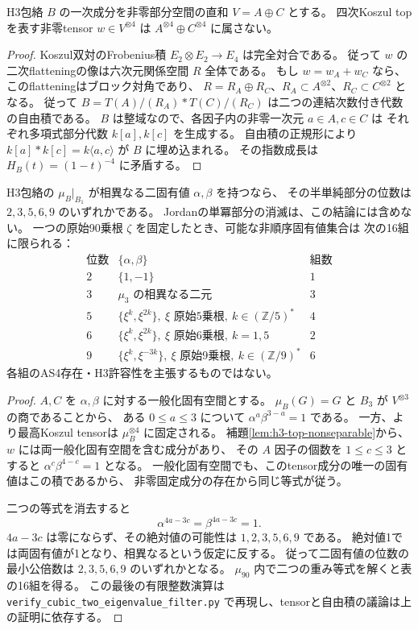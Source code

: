\begin{lemma}\label{lem:h3-top-nonseparable}
H3包絡 $B$ の一次成分を非零部分空間の直和 $V=A\oplus C$ とする。
四次Koszul topを表す非零tensor $w\in V^{\otimes4}$ は
$A^{\otimes4}\oplus C^{\otimes4}$ に属さない。
\end{lemma}
\begin{proof}
Koszul双対のFrobenius積 $E_2\otimes E_2\to E_4$ は完全対合である。
従って $w$ の二次flatteningの像は六次元関係空間 $R$ 全体である。
もし $w=w_A+w_C$ なら、このflatteningはブロック対角であり、
$R=R_A\oplus R_C$、$R_A\subset A^{\otimes2}$、$R_C\subset C^{\otimes2}$ となる。
従って $B=T(A)/(R_A)*T(C)/(R_C)$ は二つの連結次数付き代数の自由積である。
$B$ は整域なので、各因子内の非零一次元 $a\in A,c\in C$ は
それぞれ多項式部分代数 $k[a],k[c]$ を生成する。
自由積の正規形により $k[a]*k[c]=k\langle a,c\rangle$ が $B$ に埋め込まれる。
その指数成長は $H_B(t)=(1-t)^{-4}$ に矛盾する。
\end{proof}

\begin{proposition}[二固有値の有限スペクトル制約]
\label{prop:h3-two-eigenvalue-filter}
H3包絡の $\mu_B|_{B_1}$ が相異なる二固有値 $\alpha,\beta$ を持つなら、
その半単純部分の位数は $2,3,5,6,9$ のいずれかである。
Jordanの単冪部分の消滅は、この結論には含めない。
一つの原始90乗根 $\zeta$ を固定したとき、可能な非順序固有値集合は
次の16組に限られる：
\[
\begin{array}{c|l|c}
\text{位数}&\{\alpha,\beta\}&\text{組数}\\\hline
2&\{1,-1\}&1\\
3&\mu_3\text{ の相異なる二元}&3\\
5&\{\xi^k,\xi^{2k}\},\ \xi\text{ 原始5乗根},\ k\in(\mathbb Z/5)^*&4\\
6&\{\xi^k,\xi^{2k}\},\ \xi\text{ 原始6乗根},\ k=1,5&2\\
9&\{\xi^k,\xi^{-3k}\},\ \xi\text{ 原始9乗根},\ k\in(\mathbb Z/9)^*&6
\end{array}
\]
各組のAS4存在・H3許容性を主張するものではない。
\end{proposition}
\begin{proof}
$A,C$ を $\alpha,\beta$ に対する一般化固有空間とする。
$\mu_B(G)=G$ と $B_3$ が $V^{\otimes3}$ の商であることから、
ある $0\le a\le3$ について $\alpha^a\beta^{3-a}=1$ である。
一方、\cite[Theorem 6.3]{RRZ}より最高Koszul tensorは $\mu_B^{\otimes4}$ に固定される。
補題\ref{lem:h3-top-nonseparable}から、$w$ には両一般化固有空間を含む成分があり、
その $A$ 因子の個数を $1\le c\le3$ とすると
$\alpha^c\beta^{4-c}=1$ となる。
一般化固有空間でも、このtensor成分の唯一の固有値はこの積であるから、
非零固定成分の存在から同じ等式が従う。

二つの等式を消去すると
\[
 \alpha^{4a-3c}=\beta^{4a-3c}=1.
\]
$4a-3c$ は零にならず、その絶対値の可能性は $1,2,3,5,6,9$ である。
絶対値1では両固有値が1となり、相異なるという仮定に反する。
従って二固有値の位数の最小公倍数は $2,3,5,6,9$ のいずれかとなる。
$\mu_{90}$ 内で二つの重み等式を解くと表の16組を得る。
この最後の有限整数演算は
\texttt{verify\_\allowbreak{}cubic\_\allowbreak{}two\_\allowbreak{}eigenvalue\_\allowbreak{}filter.py}
で再現し、tensorと自由積の議論は上の証明に依存する。
\end{proof}

